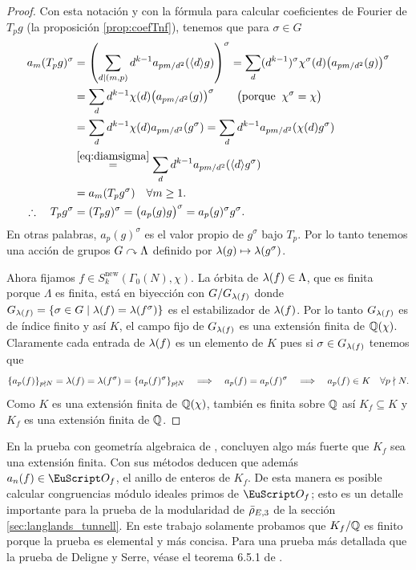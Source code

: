 \documentclass[../../tesis_maestria]{subfiles}
\begin{document}
\begin{proof}
  Con esta notaci\'on y con la f\'ormula para calcular coeficientes de Fourier de $T_pg$
  (la proposici\'on \ref{prop:coefTnf}), tenemos que para $\sigma\in G$
  \begin{align*}
    a_m(T_pg)^{\sigma}&=\left( \sum_{d\mid (m,p)}d^{k-1}a_{pm/d^2}(\langle d \rangle g) \right)^{\sigma}
                      =\sum_d(d^{k-1})^{\sigma}\chi^{\sigma}(d)\big(a_{pm/d^2}(g)\big)^{\sigma}\\
                      &=\sum_dd^{k-1}\chi(d)\big(a_{pm/d^2}(g)\big)^{\sigma}
                        \qquad\big(\text{porque}\;\;\chi^{\sigma}=\chi\big)\\
                      &=\sum_dd^{k-1}\chi(d)a_{pm/d^2}(g^{\sigma})
                      =\sum_dd^{k-1}a_{pm/d^2}(\chi(d)g^{\sigma})\\
                      &\overset{\eqref{eq:diamsigma}}{=}\sum_dd^{k-1}a_{pm/d^2}(\langle d \rangle g^{\sigma})\\
                      &=a_m(T_pg^{\sigma}) \quad\forall m\geq1.\\
    \therefore\quad T_pg^{\sigma}&=(T_pg)^{\sigma}=\big(a_p(g)g\big)^{\sigma}=a_p(g)^{\sigma}g^{\sigma}.
  \end{align*}
  En otras palabras, $a_p(g)^{\sigma}$ es el valor propio de $g^{\sigma}$ bajo $T_p$. Por lo tanto tenemos
  una acci\'on de grupos $G\curvearrowright \Lambda$ definido por $\lambda(g)\mapsto\lambda(g^{\sigma})$.

  Ahora fijamos $f\in S_k^{\mathrm{new}}(\Gamma_0(N),\chi)$. La \'orbita de $\lambda(f)\in\Lambda$, que
  es finita porque $\Lambda$ es finita, est\'a en biyecci\'on con $G/G_{\lambda(f)}$ donde
  $G_{\lambda(f)}=\{\sigma\in G\mid \lambda(f)=\lambda(f^{\sigma})\}$ es el estabilizador de $\lambda(f)$. Por lo tanto
  $G_{\lambda(f)}$ es de \'indice finito y as\'i $K$, el campo fijo de $G_{\lambda(f)}$ es una extensi\'on
  finita de $\mathbb{Q}(\chi)$. Claramente cada entrada de $\lambda(f)$ es un elemento de $K$ pues si $\sigma\in G_{\lambda(f)}$
  tenemos que
  \[
    \{a_p(f)\}_{p\nmid N}=\lambda(f)=\lambda(f^{\sigma})=\{a_p(f)^{\sigma}\}_{p\nmid N}\quad\Longrightarrow\quad a_p(f)=a_p(f)^{\sigma}
    \quad\Longrightarrow\quad a_p(f)\in K\quad\forall p\nmid N.
  \]
  Como $K$ es una extensi\'on finita de $\mathbb{Q}(\chi)$, tambi\'en es finita sobre $\mathbb{Q}$  as\'i
  $K_f\subseteq K$ y $K_f$ es una extensi\'on finita de $\mathbb{Q}$.
\end{proof}

\begin{nota}
  En la prueba con geometr\'ia algebraica de \cite{DeligneSerreFMDP1}, concluyen algo m\'as fuerte que $K_f$ sea una extensi\'on finita. Con sus m\'etodos deducen que adem\'as $a_n(f)\in\Oo_f$, el anillo de enteros de $K_f$. De esta manera es posible calcular congruencias m\'odulo ideales primos de $\Oo_f$; esto es un detalle importante para la prueba de la modularidad de $\bar{\rho}_{E,3}$ de la secci\'on \ref{sec:langlands_tunnell}.  En este trabajo solamente probamos que $K_f/\mathbb{Q}$ es finito porque la prueba es elemental y m\'as concisa. Para una prueba m\'as detallada que la prueba de Deligne y Serre, v\'ease el teorema 6.5.1 de \cite{DiamondShurmanAFCIMF}.
\end{nota}
\end{document}
